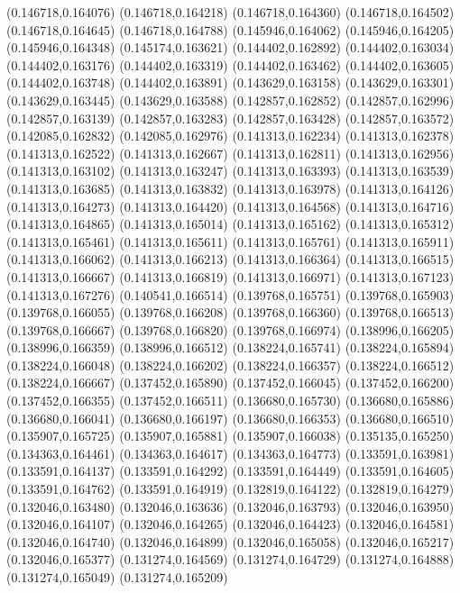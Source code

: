 (0.146718,0.164076)
(0.146718,0.164218)
(0.146718,0.164360)
(0.146718,0.164502)
(0.146718,0.164645)
(0.146718,0.164788)
(0.145946,0.164062)
(0.145946,0.164205)
(0.145946,0.164348)
(0.145174,0.163621)
(0.144402,0.162892)
(0.144402,0.163034)
(0.144402,0.163176)
(0.144402,0.163319)
(0.144402,0.163462)
(0.144402,0.163605)
(0.144402,0.163748)
(0.144402,0.163891)
(0.143629,0.163158)
(0.143629,0.163301)
(0.143629,0.163445)
(0.143629,0.163588)
(0.142857,0.162852)
(0.142857,0.162996)
(0.142857,0.163139)
(0.142857,0.163283)
(0.142857,0.163428)
(0.142857,0.163572)
(0.142085,0.162832)
(0.142085,0.162976)
(0.141313,0.162234)
(0.141313,0.162378)
(0.141313,0.162522)
(0.141313,0.162667)
(0.141313,0.162811)
(0.141313,0.162956)
(0.141313,0.163102)
(0.141313,0.163247)
(0.141313,0.163393)
(0.141313,0.163539)
(0.141313,0.163685)
(0.141313,0.163832)
(0.141313,0.163978)
(0.141313,0.164126)
(0.141313,0.164273)
(0.141313,0.164420)
(0.141313,0.164568)
(0.141313,0.164716)
(0.141313,0.164865)
(0.141313,0.165014)
(0.141313,0.165162)
(0.141313,0.165312)
(0.141313,0.165461)
(0.141313,0.165611)
(0.141313,0.165761)
(0.141313,0.165911)
(0.141313,0.166062)
(0.141313,0.166213)
(0.141313,0.166364)
(0.141313,0.166515)
(0.141313,0.166667)
(0.141313,0.166819)
(0.141313,0.166971)
(0.141313,0.167123)
(0.141313,0.167276)
(0.140541,0.166514)
(0.139768,0.165751)
(0.139768,0.165903)
(0.139768,0.166055)
(0.139768,0.166208)
(0.139768,0.166360)
(0.139768,0.166513)
(0.139768,0.166667)
(0.139768,0.166820)
(0.139768,0.166974)
(0.138996,0.166205)
(0.138996,0.166359)
(0.138996,0.166512)
(0.138224,0.165741)
(0.138224,0.165894)
(0.138224,0.166048)
(0.138224,0.166202)
(0.138224,0.166357)
(0.138224,0.166512)
(0.138224,0.166667)
(0.137452,0.165890)
(0.137452,0.166045)
(0.137452,0.166200)
(0.137452,0.166355)
(0.137452,0.166511)
(0.136680,0.165730)
(0.136680,0.165886)
(0.136680,0.166041)
(0.136680,0.166197)
(0.136680,0.166353)
(0.136680,0.166510)
(0.135907,0.165725)
(0.135907,0.165881)
(0.135907,0.166038)
(0.135135,0.165250)
(0.134363,0.164461)
(0.134363,0.164617)
(0.134363,0.164773)
(0.133591,0.163981)
(0.133591,0.164137)
(0.133591,0.164292)
(0.133591,0.164449)
(0.133591,0.164605)
(0.133591,0.164762)
(0.133591,0.164919)
(0.132819,0.164122)
(0.132819,0.164279)
(0.132046,0.163480)
(0.132046,0.163636)
(0.132046,0.163793)
(0.132046,0.163950)
(0.132046,0.164107)
(0.132046,0.164265)
(0.132046,0.164423)
(0.132046,0.164581)
(0.132046,0.164740)
(0.132046,0.164899)
(0.132046,0.165058)
(0.132046,0.165217)
(0.132046,0.165377)
(0.131274,0.164569)
(0.131274,0.164729)
(0.131274,0.164888)
(0.131274,0.165049)
(0.131274,0.165209)

